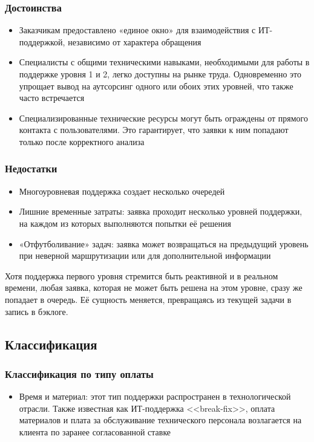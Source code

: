\documentclass{../industrial-development}
\begin{document}
\begin{frame} \frametitle{Достоинства}
	\begin{itemize} 
		\item Заказчикам предоставлено «единое окно» для взаимодействия с ИТ-поддержкой, независимо от характера обращения
		\item Специалисты с общими техническими навыками, необходимыми для работы в поддержке уровня 1 и 2, легко доступны на рынке труда. Одновременно это упрощает вывод на аутсорсинг одного или обоих этих уровней, что также часто встречается
		\item Специализированные технические ресурсы могут быть ограждены от прямого контакта с пользователями. Это гарантирует, что заявки к ним попадают только после корректного анализа
	\end{itemize}
\end{frame}

\begin{frame} \frametitle{Недостатки}
	\begin{itemize} 
		\item Многоуровневая поддержка создает несколько очередей
		\item Лишние временные затраты: заявка проходит несколько уровней поддержки, на каждом из которых выполняются попытки её решения
		\item «Отфутболивание» задач: заявка может возвращаться на предыдущий уровень при неверной маршрутизации или для дополнительной информации
	\end{itemize}
\end{frame}

\lecturenotes Хотя поддержка первого уровня стремится быть реактивной и в реальном времени, любая заявка, которая не может быть решена на этом уровне, сразу же попадает в очередь. Её сущность меняется, превращаясь из текущей задачи в запись в бэклоге.



\subsection{Классификация}
\begin{frame} \frametitle{Классификация по типу оплаты}
	\begin{itemize} 
		\item {Время и материал}: этот тип поддержки распространен в технологической отрасли. Также известная как ИТ-поддержка <<break-fix>>, оплата материалов и плата за обслуживание технического персонала возлагается на клиента по заранее согласованной ставке
	\end{itemize}
\end{frame}
\end{document}
